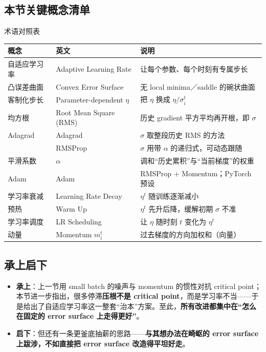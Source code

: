 \documentclass[a4paper]{article}
\begin{document}
\subsection{本节关键概念清单}

\begin{knowledgebox}{术语对照表}
    \begin{center}
    \begin{tabular}{lll}
        \toprule
        \textbf{概念} & \textbf{英文} & \textbf{说明} \\
        \midrule
        自适应学习率 & Adaptive Learning Rate & 让每个参数、每个时刻有专属步长 \\
        凸误差曲面 & Convex Error Surface & 无 local minima／saddle 的碗状曲面 \\
        客制化步长 & Parameter-dependent $\eta$ & 把 $\eta$ 换成 $\eta/\sigma_i^{t}$ \\
        均方根 & Root Mean Square (RMS) & 历史 gradient 平方平均再开根，即 $\sigma$ \\
        Adagrad & Adagrad & $\sigma$ 取整段历史 RMS 的方法 \\
        & RMSProp & $\sigma$ 用带 $\alpha$ 的递归式，可动态跟随 \\
        平滑系数 & $\alpha$ & 调和``历史累积''与``当前梯度''的权重 \\
        Adam & Adam & RMSProp $+$ Momentum；PyTorch 预设 \\
        学习率衰减 & Learning Rate Decay & $\eta^{t}$ 随训练逐渐减小 \\
        预热 & Warm Up & $\eta^{t}$ 先升后降，缓解初期 $\sigma$ 不准 \\
        学习率调度 & LR Scheduling & 让 $\eta$ 随时刻 $t$ 变化为 $\eta^{t}$ \\
        动量 & Momentum $m_i^{t}$ & 过去梯度的方向加权和（向量） \\
        \bottomrule
    \end{tabular}
    \end{center}
\end{knowledgebox}

\subsection{承上启下}

\begin{itemize}
    \item \textbf{承上}：上一节用 small batch 的噪声与 momentum 的惯性对抗 critical point；本节进一步指出，很多停滞\textbf{压根不是 critical point}，而是学习率不当——于是给出了自适应学习率这一整套``治本''方案。至此，\textbf{所有改进都集中在``怎么在固定的 error surface 上走得更好''}。
    \item \textbf{启下}：但还有一条更釜底抽薪的思路——\textbf{与其想办法在崎岖的 error surface 上跋涉，不如直接把 error surface 改造得平坦好走}。
\end{itemize}
\end{document}
